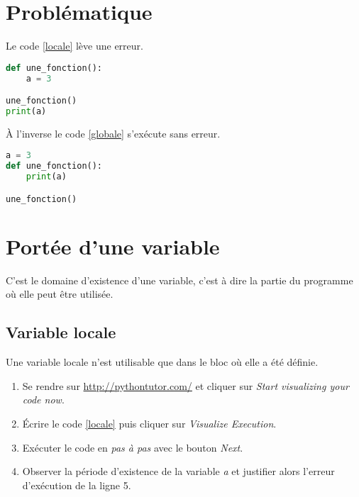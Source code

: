 \documentclass[a4paper,11pt]{article}
\begin{document}
\begin{Form}
\section{Problématique}
Le code \ref{locale} lève une erreur.
\begin{center}
\begin{lstlisting}[language=Python]
def une_fonction():
	a = 3

une_fonction()
print(a)
\end{lstlisting}
\label{locale}
\end{center}
À l'inverse le code \ref{globale} s'exécute sans erreur.
\begin{center}
\begin{lstlisting}[language=Python]
a = 3
def une_fonction():
    print(a)

une_fonction()
\end{lstlisting}
\label{globale}
\end{center}
\begin{center}
\end{center}
\section{Portée d'une variable}
C'est le domaine d'existence d'une variable, c'est à dire la partie du programme où elle peut être utilisée.
\subsection{Variable locale}
\begin{aretenir}[]
Une variable locale n'est utilisable que dans le bloc où elle a été définie.
\end{aretenir}
\begin{activite}
\begin{enumerate}
\item Se rendre sur \url{http://pythontutor.com/} et cliquer sur \emph{Start visualizing your code now}.
\item Écrire le code \ref{locale} puis cliquer sur \emph{Visualize Execution}.
\item Exécuter le code en \emph{pas à pas} avec le bouton \emph{Next}.
\item Observer la période d'existence de la variable \emph{a} et justifier alors l'erreur d'exécution de la ligne 5.
\end{enumerate}
\end{activite}

\end{Form}
\end{document}
